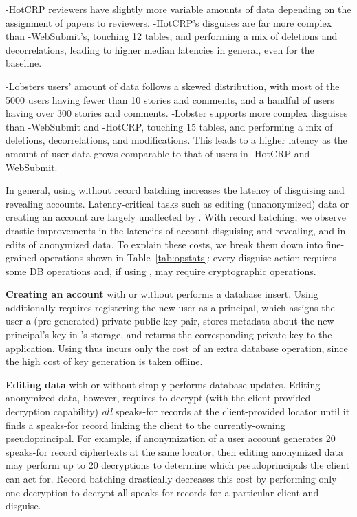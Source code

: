 \sys-HotCRP reviewers have slightly more variable amounts of data  depending on the
assignment of papers to reviewers. \sys-HotCRP's disguises are far more complex than
\sys-WebSubmit's, touching 12 tables, and performing a mix of deletions and
decorrelations, leading to higher median latencies in general, even for the baseline.

\sys-Lobsters users' amount of data follows a skewed distribution, with most of the 5000 users
having fewer than 10 stories and comments, and a handful of users having over 300 stories and
comments. \sys-Lobster supports more complex disguises than \sys-WebSubmit and \sys-HotCRP,
touching 15 tables, and performing a mix of deletions, decorrelations, and modifications. This leads
to a higher latency as the amount of user data grows comparable to that of users in \sys-HotCRP and
\sys-WebSubmit.

In general, using \sys without record batching increases the latency of
disguising and revealing accounts. Latency-critical tasks such as editing (unanonymized) data or
creating an account are largely unaffected by \sys. With record batching, we observe drastic
improvements in the latencies of account disguising and revealing, and in edits of anonymized data.
%
To explain these costs, we break them down into fine-grained operations shown in
Table~\ref{tab:opstats}: every disguise action requires some DB operations and,
if using \sys, may require cryptographic operations.

\textbf{Creating an account} with or without \sys performs a database insert. Using \sys additionally
requires registering the new user as a principal, which assigns the user a (pre-generated)
private-public key pair, stores metadata about the new principal's key in \sys's storage, and
returns the corresponding private key to the application.
Using \sys thus incurs only the cost of an extra database operation, since the high cost of key
generation is taken offline.

\textbf{Editing data} with or without \sys simply performs database updates. Editing anonymized
data, however, requires \sys to decrypt (with the client-provided decryption capability) \emph{all}
speaks-for records at the client-provided locator until it finds a speaks-for record linking the
client to the currently-owning pseudoprincipal.  For example, if anonymization of a user account
generates 20 speaks-for record ciphertexts at the same locator, then editing anonymized data may
perform up to 20 decryptions to determine which pseudoprincipals the client can act for.  Record
batching drastically decreases this cost by performing only one decryption to decrypt all speaks-for
records for a particular client and disguise.

